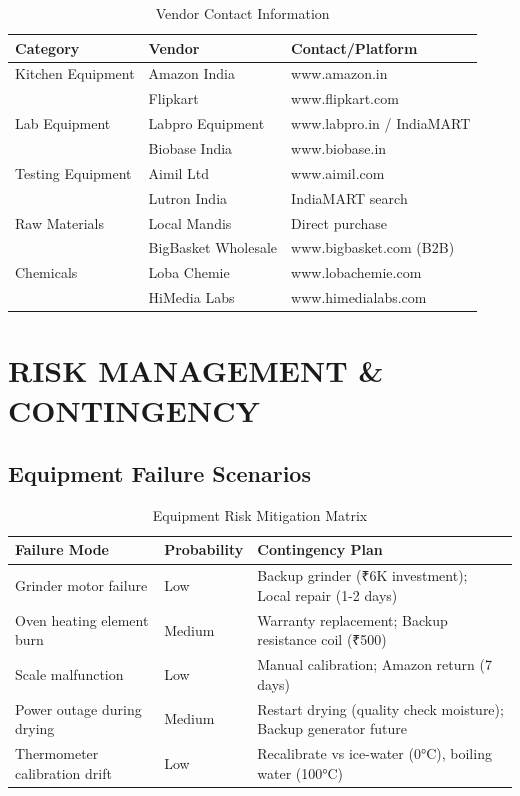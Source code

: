 \documentclass[12pt,a4paper]{article}
\begin{document}
\begin{table}[h]
\centering
\scriptsize
\begin{tabular}{llp{5cm}}
\toprule
\textbf{Category} & \textbf{Vendor} & \textbf{Contact/Platform} \\
\midrule
Kitchen Equipment & Amazon India & www.amazon.in \\
& Flipkart & www.flipkart.com \\
Lab Equipment & Labpro Equipment & www.labpro.in / IndiaMART \\
& Biobase India & www.biobase.in \\
Testing Equipment & Aimil Ltd & www.aimil.com \\
& Lutron India & IndiaMART search \\
Raw Materials & Local Mandis & Direct purchase \\
& BigBasket Wholesale & www.bigbasket.com (B2B) \\
Chemicals & Loba Chemie & www.lobachemie.com \\
& HiMedia Labs & www.himedialabs.com \\
\bottomrule
\end{tabular}
\caption{Vendor Contact Information}
\end{table}

\newpage

\section{RISK MANAGEMENT \& CONTINGENCY}

\subsection{Equipment Failure Scenarios}

\begin{table}[h]
\centering
\small
\begin{tabular}{p{4cm}p{3cm}p{6cm}}
\toprule
\textbf{Failure Mode} & \textbf{Probability} & \textbf{Contingency Plan} \\
\midrule
Grinder motor failure & Low & Backup grinder (₹6K investment); Local repair (1-2 days) \\
Oven heating element burn & Medium & Warranty replacement; Backup resistance coil (₹500) \\
Scale malfunction & Low & Manual calibration; Amazon return (7 days) \\
Power outage during drying & Medium & Restart drying (quality check moisture); Backup generator future \\
Thermometer calibration drift & Low & Recalibrate vs ice-water (0°C), boiling water (100°C) \\
\bottomrule
\end{tabular}
\caption{Equipment Risk Mitigation Matrix}
\end{table}
\end{document}
